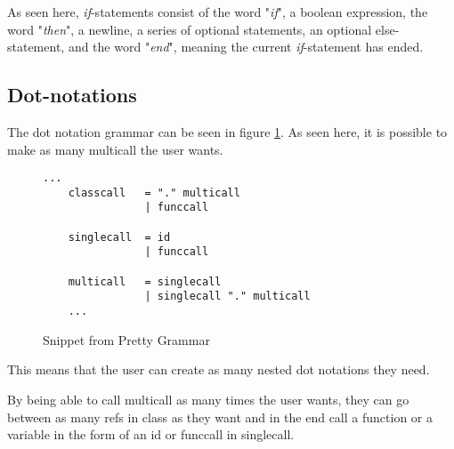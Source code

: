 As seen here, \textit{if}-statements consist of the word "\textit{if}", a boolean expression, the word "\textit{then}", a newline, a series of optional statements, an optional else-statement, and the word "\textit{end}", meaning the current \textit{if}-statement has ended.

\subsection{Dot-notations}
The dot notation grammar can be seen in figure \ref{fig:DotNotion}. As seen here, it is possible to make as many multicall  the user wants.

\begin{figure}[H]
    \centering
    \begin{lstlisting}[]
    ...
    classcall   = "." multicall      
                | funccall
                
    singlecall  = id
                | funccall
                
    multicall   = singlecall
                | singlecall "." multicall
    ...
    \end{lstlisting}
    \caption{Snippet from Pretty Grammar\label{fig:DotNotion}}
\end{figure}

\begin{comment}
Genfunccal = (genID'.')* funccal
           | (genfunccal '.')* funccal      Generalized function call
           
           
genId      = (genId '.')* id
           | (genfunccall '.')* id   Generalized variable / class identificator.
\end{comment}

This means that the user can create as many nested dot notations they need.

By being able to call multicall as many times the user wants, they can go between as many refs in class as they want and in the end call a function or a variable in the form of an id or funccall in singlecall. 



\begin{comment}
To make the description of the syntax of BFGL more clear, Gio suggest to start from section 4.3 (The syntax of BFGL) and give the ENTIRE EBNF for BFGL (replacing trivial token with their definition).


After that you can explain some design choices made in BFGL by referring to the corresponding productions as you did starting from section 4.3.1
\end{comment}